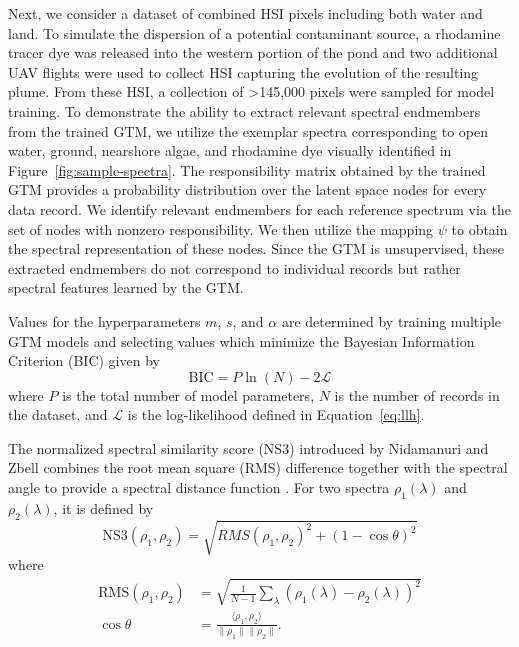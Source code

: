 Next, we consider a dataset of combined HSI pixels including both water and land. To simulate the dispersion of a potential contaminant source, a rhodamine tracer dye was released into the western portion of the pond and two additional UAV flights were used to collect HSI capturing the evolution of the resulting plume. From these HSI, a collection of >145,000 pixels were sampled for model training. To demonstrate the ability to extract relevant spectral endmembers from the trained GTM, we utilize the exemplar spectra corresponding to open water, ground, nearshore algae, and rhodamine dye visually identified in Figure~\ref{fig:sample-spectra}. The responsibility matrix obtained by the trained GTM provides a probability distribution over the latent space nodes for every data record. We identify relevant endmembers for each reference spectrum via the set of nodes with nonzero responsibility. We then utilize the mapping $\psi$ to obtain the spectral representation of these nodes. Since the GTM is unsupervised, these extracted endmembers do not correspond to individual records but rather spectral features learned by the GTM. 

Values for the hyperparameters $m$, $s$, and $\alpha$ are determined by training multiple GTM models and selecting values which minimize the Bayesian Information Criterion (BIC) given by 
\begin{equation}
    \text{BIC} = P\ln(N) - 2\mathcal{L}
\end{equation}
where $P$ is the total number of model parameters, $N$ is the number of records in the dataset, and $\mathcal{L}$ is the log-likelihood defined in Equation~\eqref{eq:llh}.

The normalized spectral similarity score (NS3) introduced by Nidamanuri and Zbell combines the root mean square (RMS) difference together with the spectral angle to provide a spectral distance function \cite{nidamanuri2010normalized}. For two spectra $\rho_1(\lambda)$ and $\rho_2(\lambda)$, it is defined by
\begin{equation}
    \text{NS3}(\rho_1, \rho_2) = \sqrt{RMS(\rho_1, \rho_2)^2 + (1-\cos\theta)^2}
\end{equation}
where
\begin{align}
    \text{RMS}(\rho_1, \rho_2) &= \sqrt{\frac{1}{N-1}\sum_\lambda \left(\rho_{1}(\lambda) - \rho_2(\lambda) \right)^2} \\
    \cos\theta &= \frac{\langle \rho_1 , \rho_2 \rangle}{\lVert \rho_1\rVert \lVert \rho_2 \rVert}.
\end{align}

